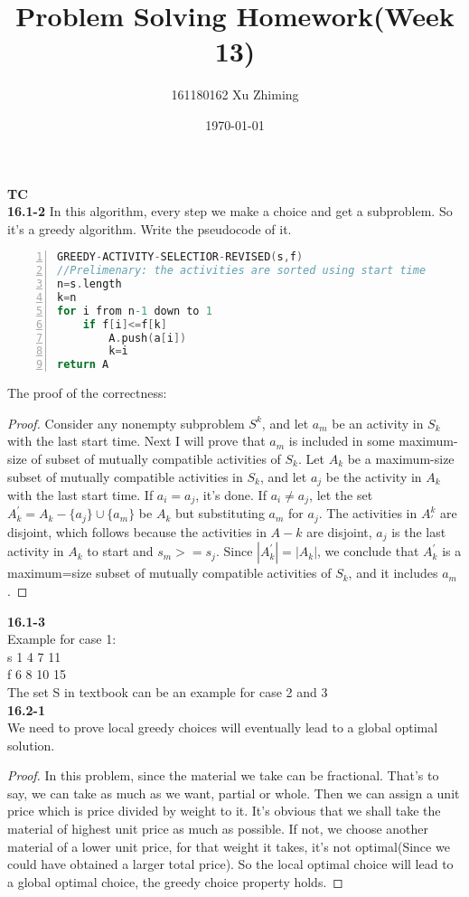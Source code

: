 \documentclass{article}
\begin{document}
\title{Problem Solving Homework(Week 13)}\author{161180162 Xu Zhiming}\date{\today}\maketitle
\setlength\parindent{0em}
\large\textbf{TC}\\
\textbf{16.1-2}
In this algorithm, every step we make a choice and get a subproblem. So it's a greedy algorithm.
Write the pseudocode of it.
\begin{lstlisting}[language=C,numbers=left]
GREEDY-ACTIVITY-SELECTIOR-REVISED(s,f)
//Prelimenary: the activities are sorted using start time
n=s.length
k=n
for i from n-1 down to 1
	if f[i]<=f[k]
		A.push(a[i])	
		k=i
return A
\end{lstlisting}
The proof of the correctness:
\begin{proof}
Consider any nonempty subproblem $S^k$, and let $a_m$ be an activity in $S_k$ with the last start time.
Next I will prove that $a_m$ is included in some maximum-size of subset of mutually compatible activities
of $S_k$. Let $A_k$ be a maximum-size subset of mutually compatible activities in $S_k$, and let $a_j$ be 
the activity in $A_k$ with the last start time. If $a_i=a_j$, it's done. If $a_i\neq a_j$, let the set 
$A_k^{'}=A_k-\{a_j\}\cup\{a_m\}$ be $A_k$ but substituting $a_m$ for $a_j$. The activities in $A^k_{'}$ are
disjoint, which follows because the activities in $A-k$ are disjoint, $a_j$ is the last activity in $A_k$ to
start and $s_m>=s_j$. Since $|A_k^{'}|=|A_k|$, we conclude that $A_k^{'}$ is a maximum=size subset of mutually
compatible activities of $S_k$, and it includes $a_m$.
\end{proof}
\textbf{16.1-3}\\
Example for case 1:\\
s 1 4  7 11\\ 
f 6 8 10 15\\
The set S in textbook can be an example for case 2 and 3\\ 
\textbf{16.2-1}\\
We need to prove local greedy choices will eventually lead to a global optimal solution.
\begin{proof}
In this problem, since the material we take can be fractional. That's to say, we can take as much as we want, partial
or whole. Then we can assign a unit price which is price divided by weight to it. It's obvious that we shall take the
material of highest unit price as much as possible. If not, we choose another material of a lower unit price, for that
weight it takes, it's not optimal(Since we could have obtained a larger total price). So the local optimal choice will
lead to a global optimal choice, the greedy choice property holds.  
\end{proof}
\end{document}
